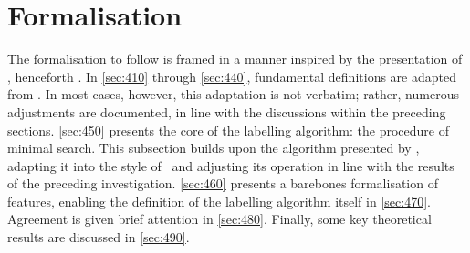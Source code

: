 \section{Formalisation}\label{sec:400}

The formalisation to follow is framed in a manner inspired by the presentation of \textcite{CollinsC.StablerE_2016}, henceforth \CS. In \autoref{sec:410} through \autoref{sec:440}, fundamental definitions are adapted from \CS. In most cases, however, this adaptation is not verbatim; rather, numerous adjustments are documented, in line with the discussions within the preceding sections. \autoref{sec:450} presents the core of the labelling algorithm: the procedure of minimal search. This subsection builds upon the algorithm presented by \textcite{KeH_2019}, adapting it into the style of \CS\ and adjusting its operation in line with the results of the preceding investigation. \autoref{sec:460} presents a barebones formalisation of features, enabling the definition of the labelling algorithm itself in \autoref{sec:470}. Agreement is given brief attention in \autoref{sec:480}. Finally, some key theoretical results are discussed in \autoref{sec:490}.

